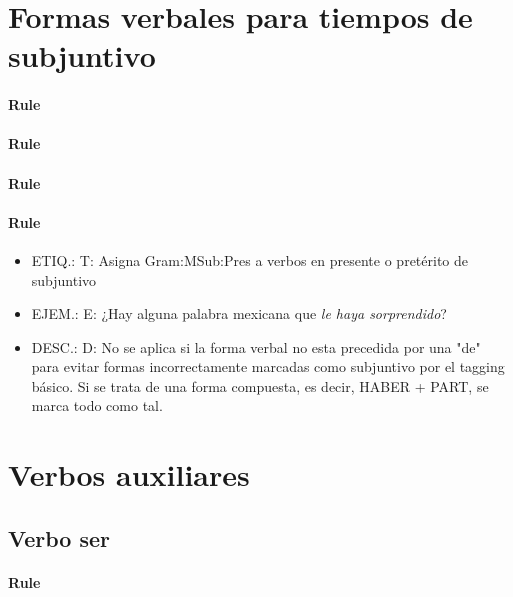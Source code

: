 \documentclass[11pt]{report}
\begin{document}
\section{Formas verbales para tiempos de subjuntivo}
\paragraph*{Rule}
\paragraph*{Rule}
\paragraph*{Rule}
\paragraph*{Rule}
\begin{itemize}
\item ETIQ.:  T: Asigna Gram:MSub:Pres a verbos en presente o pretérito de subjuntivo
\item EJEM.:  E: ¿Hay alguna palabra mexicana que \emph{le haya sorprendido}?
\item DESC.:  D: No se aplica si la forma verbal no esta precedida por una "de" para evitar formas incorrectamente marcadas como subjuntivo por el tagging básico. Si se trata de una forma compuesta, es decir, HABER + PART, se marca todo como tal.
\end{itemize}

\section{Verbos auxiliares}
\subsection{Verbo ser}
\paragraph*{Rule}
\end{document}

